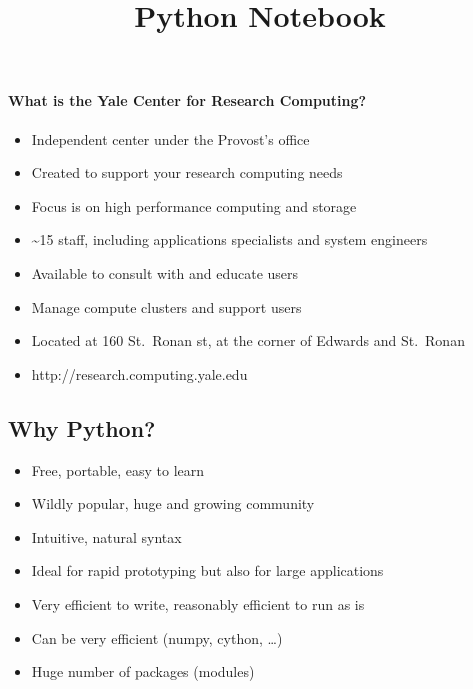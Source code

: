 \documentclass{article}
\title{Python Notebook}
\begin{document}
    
    
    \maketitle
    
    

    
    \paragraph{What is the Yale Center for Research
Computing?}\label{what-is-the-yale-center-for-research-computing}

\begin{itemize}
\itemsep1pt\parskip0pt
\item
  Independent center under the Provost's office
\item
  Created to support your research computing needs
\item
  Focus is on high performance computing and storage
\item
  \textasciitilde{}15 staff, including applications specialists and
  system engineers
\item
  Available to consult with and educate users
\item
  Manage compute clusters and support users
\item
  Located at 160 St.~Ronan st, at the corner of Edwards and St.~Ronan
\item
  http://research.computing.yale.edu
\end{itemize}

    \subsection{Why Python?}\label{why-python}

\begin{itemize}
\itemsep1pt\parskip0pt
\item
  Free, portable, easy to learn
\item
  Wildly popular, huge and growing community
\item
  Intuitive, natural syntax
\item
  Ideal for rapid prototyping but also for large applications
\item
  Very efficient to write, reasonably efficient to run as is
\item
  Can be very efficient (numpy, cython, \ldots{})
\item
  Huge number of packages (modules)
\end{itemize}
\end{document}
